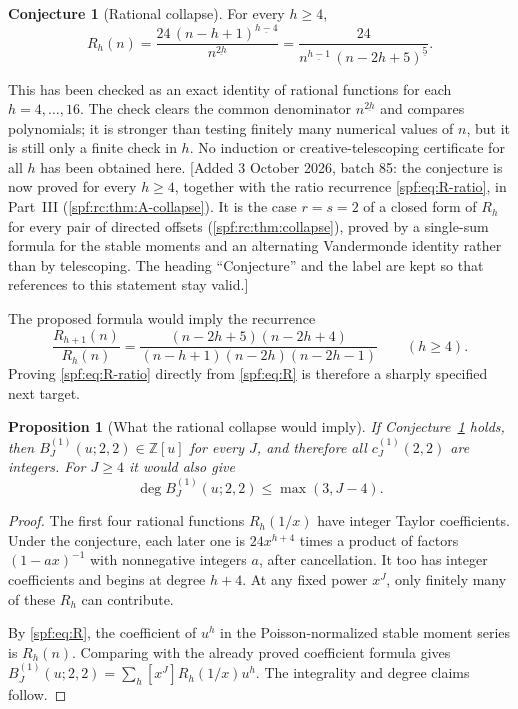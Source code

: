 \documentclass[11pt]{article}
\numberwithin{equation}{section}
\newtheorem{proposition}[theorem]{Proposition}
\theoremstyle{definition}
\newtheorem{conjecture}[theorem]{Conjecture}
\theoremstyle{remark}
\theoremstyle{definition}
\newcommand{\Z}{\mathbb Z}
\newcommand{\fall}[2]{{#1}^{\underline{#2}}}
\begin{document}
\begin{conjecture}[Rational collapse]
\label{spf:conj:collapse}
For every $h\ge4$,
\begin{equation}
 R_h(n)=\frac{24\,\fall{(n-h+1)}{h-4}}{\fall n{2h}}
       =\frac{24}{\fall n{h-1}\,\fall{(n-2h+5)}5}.
 \label{spf:eq:collapse}
\end{equation}
\end{conjecture}

This has been checked as an exact identity of rational functions for each
$h=4,\ldots,16$. The check clears the common denominator $\fall n{2h}$ and
compares polynomials; it is stronger than testing finitely many numerical
values of $n$, but it is still only a finite check in $h$. No induction or
creative-telescoping certificate for all $h$ has been obtained here.
[Added 3 October 2026, batch 85: the conjecture is now proved for every
$h\ge4$, together with the ratio recurrence \eqref{spf:eq:R-ratio}, in
Part~III (\cref{spf:rc:thm:A-collapse}). It is the case $r=s=2$ of a closed
form of $R_h$ for every pair of directed offsets
(\cref{spf:rc:thm:collapse}), proved by a single-sum formula for the stable
moments and an alternating Vandermonde identity rather than by
telescoping. The heading ``Conjecture'' and the label are kept so that
references to this statement stay valid.]

The proposed formula would imply the recurrence
\begin{equation}
 \frac{R_{h+1}(n)}{R_h(n)}
 =\frac{(n-2h+5)(n-2h+4)}{(n-h+1)(n-2h)(n-2h-1)}
 \qquad(h\ge4).
 \label{spf:eq:R-ratio}
\end{equation}
Proving \eqref{spf:eq:R-ratio} directly from \eqref{spf:eq:R} is therefore a sharply
specified next target.

\begin{proposition}[What the rational collapse would imply]
\label{spf:prop:collapse-implication}
If Conjecture~\ref{spf:conj:collapse} holds, then
$B_J^{(1)}(u;2,2)\in\Z[u]$ for every $J$, and therefore all
$c_J^{(1)}(2,2)$ are integers. For $J\ge4$ it would also give
\begin{equation}
 \deg B_J^{(1)}(u;2,2)\le\max(3,J-4).
\end{equation}
\end{proposition}
\begin{proof}
The first four rational functions $R_h(1/x)$ have integer Taylor
coefficients. Under the conjecture, each later one is $24x^{h+4}$ times a
product of factors $(1-ax)^{-1}$ with nonnegative integers $a$, after
cancellation. It too has integer coefficients and begins at degree $h+4$.
At any fixed power $x^J$, only finitely many of these $R_h$ can contribute.

By \eqref{spf:eq:R}, the coefficient of $u^h$ in the Poisson-normalized stable
moment series is $R_h(n)$. Comparing with the already proved coefficient
formula gives
$B_J^{(1)}(u;2,2)=\sum_h[x^J]R_h(1/x)u^h$.
The integrality and degree claims follow.
\end{proof}
\end{document}
